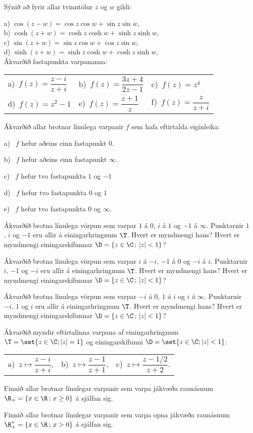 \daemi Sýnið að fyrir allar tvinntölur $z$ og $w$ gildi:

\smallskip\noindent
a)  $\cos(z-w)=\cos z\cos w+\sin z \sin w$,\\
b)  $\cosh(z+w)=\cosh z\cosh w+\sinh z \sinh w$,\\
c)  $\sin(z+w)=\sin z\cos w+\cos z \sin w$,\\
d)  $\sinh(z+w)=\sinh z\cosh w+\cosh z \sinh w$,\\


\daemi Ákvarðið fastapunkta varpananna:

\smallskip
\begin{tabular}{lll}
a)\ $f(z)=\dfrac{z-i}{z+i}$  &
b)\ $f(z)=\dfrac{3z+4}{2z-1}$  &
c)\ $f(z)=z^4$  \\
d)\ $f(z)=z^2-1$&
e)\ $f(z)=\dfrac{z+1}{z}$  &
f)\ $f(z)=\dfrac{z}{z+i}$
\end{tabular}


\daemi Ákvarðið allar brotnar línulega varpanir $f$ sem hafa eftirtalda
eiginleika:

\smallskip
a) \ $f$ hefur aðeins einn fastapunkt $0$.

\smallskip
b) \ $f$ hefur aðeins einn fastapunkt $\infty$.

\smallskip
c) \ $f$ hefur tvo fastapunkta $1$ og $-1$

\smallskip
d) \ $f$ hefur tvo fastapunkta $0$ og $1$

\smallskip
e) \ $f$ hefur tvo fastapunkta $0$ og $\infty$.

\daemi  Ákvarðið brotna línulega vörpun  sem varpar $1$ á $0$,
$i$ á $1$ og $-1$ á $\infty$.  Punktarnir $1$, $i$ og $-1$ eru allir á
einingarhringnum $\T$.  Hvert er myndmengi hans?  Hvert er myndmengi 
einingarskífunnar $\D=\{z\in \C\,;\, |z|<1\}$?

\daemi  Ákvarðið brotna línulega vörpun  sem varpar $i$ á $-i$,
$-1$ á $0$ og $-i$ á $i$.  Punktarnir $i$, $-1$ og $-i$ eru allir á
einingarhringnum $\T$.  Hvert er myndmengi hans?  Hvert er myndmengi 
einingarskífunnar $\D=\{z\in \C\,;\, |z|<1\}$?


\daemi  Ákvarðið brotna línulega vörpun  sem varpar $-i$ á $0$,
$1$ á $i$ og $i$ á $\infty$.  Punktarnir $-i$, $1$ og $i$ eru allir á
einingarhringnum $\T$.  Hvert er myndmengi hans?  Hvert er myndmengi 
einingarskífunnar $\D=\{z\in \C\,;\, |z|<1\}$?

\daemi Ákvarðið myndir eftirtalinna varpana af einingarhringnum $\T=\set{z\in \C; 
|z|=1}$ og einingarskífunni $\D=\set{z\in \C;  |z|<1}$:

\smallskip
\begin{tabular}{lll}
a)\ $z\mapsto \dfrac{z-i}{z+i}$,  &
b)\ $z\mapsto \dfrac{z-1}{z+1}$,  &
c)\ $z\mapsto \dfrac{z-1/2}{z+2}$.
\end{tabular}

\daemi Finnið allar brotnar línulegar varpanir sem varpa jákvæða
raunásnum $\R_+=\{x\in \R\,;\, x\geq 0\}$ á sjálfan sig.

\daemi Finnið allar brotnar línulegar varpanir sem varpa opna jákvæða 
raunásnum $\R_+^*=\{x\in \R\,;\, x>0\}$ á sjálfan sig.


